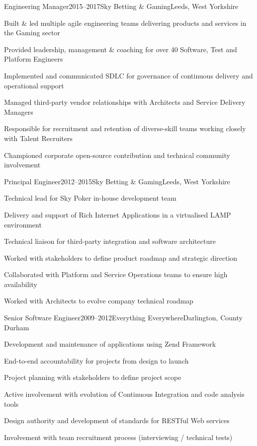 \documentclass{cv}
\begin{document}

\begin{experience}{Engineering Manager}{2015--2017}{Sky Betting \& Gaming}{Leeds, West Yorkshire}
\item Built \& led multiple agile engineering teams delivering products and services in the Gaming sector
\item Provided leadership, management \& coaching for over 40 Software, Test and Platform Engineers
\item Implemented and communicated SDLC for governance of continuous delivery and operational support
\item Managed third-party vendor relationships with Architects and Service Delivery Managers
\item Responsible for recruitment and retention of diverse-skill teams working closely with Talent Recruiters
\item Championed corporate open-source contribution and technical community involvement
\end{experience}


\begin{experience}{Principal Engineer}{2012--2015}{Sky Betting \& Gaming}{Leeds, West Yorkshire}
\item Technical lead for Sky Poker in-house development team
\item Delivery and support of Rich Internet Applications in a virtualised LAMP environment
\item Technical liaison for third-party integration and software architecture
\item Worked with stakeholders to define product roadmap and strategic direction
\item Collaborated with Platform and Service Operations teams to ensure high availability
\item Worked with Architects to evolve company technical roadmap
\end{experience}


\begin{experience}{Senior Software Engineer}{2009--2012}{Everything Everywhere}{Darlington, County Durham}
\item Development and maintenance of applications using Zend Framework
\item End-to-end accountability for projects from design to launch
\item Project planning with stakeholders to define project scope
\item Active involvement with evolution of Continuous Integration and code analysis tools
\item Design authority and development of standards for RESTful Web services
\item Involvement with team recruitment process (interviewing / technical tests)
\end{experience}
\end{document}
